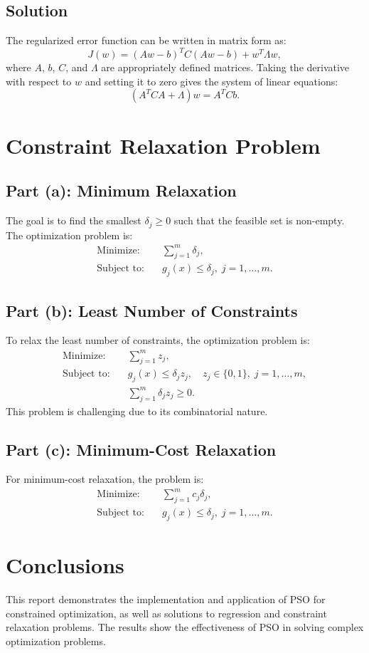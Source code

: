 \documentclass[12pt]{article}
\begin{document}
\subsection{Solution}
The regularized error function can be written in matrix form as:
\begin{equation*}
    J(w) = (Aw - b)^T C (Aw - b) + w^T \Lambda w,
\end{equation*}
where $A$, $b$, $C$, and $\Lambda$ are appropriately defined matrices. Taking the derivative with respect to $w$ and setting it to zero gives the system of linear equations:
\begin{equation*}
    (A^T C A + \Lambda) w = A^T C b.
\end{equation*}

\section{Constraint Relaxation Problem}

\subsection{Part (a): Minimum Relaxation}
The goal is to find the smallest $\delta_j \geq 0$ such that the feasible set is non-empty. The optimization problem is:
\begin{align*}
    \text{Minimize:} & \quad \sum_{j=1}^{m} \delta_j, \\
    \text{Subject to:} & \quad g_j(x) \leq \delta_j, \; j = 1, \dots, m.
\end{align*}

\subsection{Part (b): Least Number of Constraints}
To relax the least number of constraints, the optimization problem is:
\begin{align*}
    \text{Minimize:} & \quad \sum_{j=1}^{m} z_j, \\
    \text{Subject to:} & \quad g_j(x) \leq \delta_j z_j, \quad z_j \in \{0, 1\}, \; j = 1, \dots, m, \\
                 & \quad \sum_{j=1}^{m} \delta_j z_j \geq 0.
\end{align*}
This problem is challenging due to its combinatorial nature.

\subsection{Part (c): Minimum-Cost Relaxation}
For minimum-cost relaxation, the problem is:
\begin{align*}
    \text{Minimize:} & \quad \sum_{j=1}^{m} c_j \delta_j, \\
    \text{Subject to:} & \quad g_j(x) \leq \delta_j, \; j = 1, \dots, m.
\end{align*}

\section{Conclusions}
This report demonstrates the implementation and application of PSO for constrained optimization, as well as solutions to regression and constraint relaxation problems. The results show the effectiveness of PSO in solving complex optimization problems.
\end{document}
